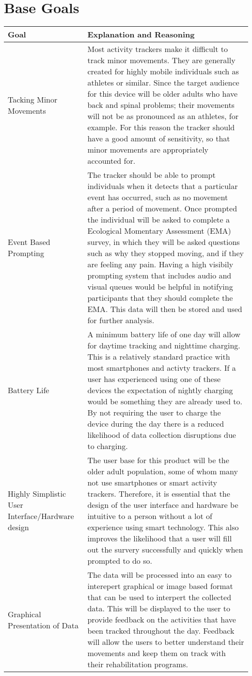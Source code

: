 \documentclass{article}
\begin{document}
\section{Base Goals}
\begin{center}
\begin{tabular}{ | m{7em} | m{32em}| } 
    \hline
    \textbf{Goal} & \textbf{Explanation and Reasoning} \\
    \hline
    Tacking Minor Movements & Most activity trackers make it difficult to track minor movements.
    They are generally created for highly mobile individuals such as athletes or similar. Since the target audience for this device will be older adults who have back and spinal problems; their movements will not be as pronounced as an athletes, for example. For this reason the tracker should have a good amount of sensitivity, so that minor movements are appropriately accounted for.  \\ 
    \hline
    Event Based Prompting & The tracker should be able to prompt individuals when it detects that a particular event has occurred, such as no movement after a period of movement.  Once prompted the individual will be asked to complete a Ecological Momentary Assessment (EMA) survey, in which they will be asked questions such as why they stopped moving, and if they are feeling any pain. Having a high visibily prompting system that includes audio and visual queues would be helpful in notifying participants that they should complete the EMA. This data will then be stored and used for further analysis. \\ 
    \hline
    Battery Life & A minimum battery life of one day will allow for daytime tracking and nighttime charging. This is a relatively standard practice with most smartphones and activty trackers. If a user has experienced using one of these devices the expectation of nightly charging would be something they are already used to. By not requiring the user to charge the device during the day there is a reduced likelihood of data collection disruptions due to charging.  \\ 
    \hline
	Highly Simplistic User Interface/Hardware design & The user base for this product will be the older adult population, some of whom many not use smartphones or smart activity trackers. Therefore, it is essential that the design of the user interface and hardware be intuitive to a person without a lot of experience using smart technology. This also improves the likelihood that a user will fill out the survery successfully and quickly when prompted to do so. \\
	\hline
	Graphical Presentation of Data & The data will be processed into an easy to interepert graphical or image based format that can be used to interpert the collected data. This will be displayed to the user to provide feedback on the activities that have been tracked throughout the day. Feedback will allow the users to better understand their movements and keep them on track with their rehabilitation programs. \\
	\hline
\end{tabular}
\end{center}
\pagebreak
\end{document}
